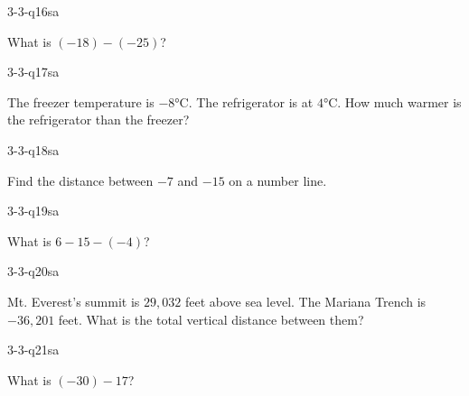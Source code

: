 
\begin{practiceQuestion}{3-3-q16}{sa}
\begin{questionText}
What is $(-18) - (-25)$?
\end{questionText}
\end{practiceQuestion}

\begin{practiceQuestion}{3-3-q17}{sa}
\begin{questionText}
The freezer temperature is $-8°$C. The refrigerator is at $4°$C. How much warmer is the refrigerator than the freezer?
\end{questionText}
\end{practiceQuestion}

\begin{practiceQuestion}{3-3-q18}{sa}
\begin{questionText}
Find the distance between $-7$ and $-15$ on a number line.
\end{questionText}
\end{practiceQuestion}

\begin{practiceQuestion}{3-3-q19}{sa}
\begin{questionText}
What is $6 - 15 - (-4)$?
\end{questionText}
\end{practiceQuestion}

\begin{practiceQuestion}{3-3-q20}{sa}
\begin{questionText}
Mt. Everest's summit is $29{,}032$ feet above sea level. The Mariana Trench is $-36{,}201$ feet. What is the total vertical distance between them?
\end{questionText}
\end{practiceQuestion}

\begin{practiceQuestion}{3-3-q21}{sa}
\begin{questionText}
What is $(-30) - 17$?
\end{questionText}
\end{practiceQuestion}

